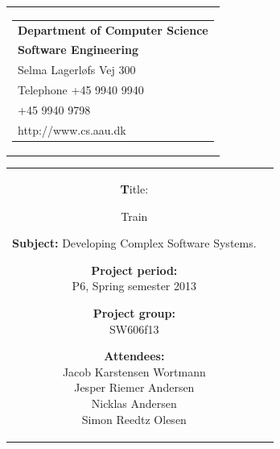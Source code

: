 \begin{titlingpage}
\begin{nopagebreak}
{\samepage 
\begin{tabular}{r}
\parbox{\textwidth}{  
\hfill \parbox{4.9cm}{\begin{tabular}{l}
{\textsf{\small \textbf{Department of Computer Science}}}\\
{\textsf{\small  \textbf{Software Engineering}}} \\
{\textsf{\small Selma Lagerløfs Vej 300}} \\
{\textsf{\small Telephone +45 9940 9940}} \\
{\textsf{\small +45 9940 9798}} \\
{\textsf{\small http://www.cs.aau.dk}}
\end{tabular}}}
\\
\end{tabular}

\begin{tabular}{cc}
\parbox{6cm}{
\begin{description}

\item {\textbf Title:} 

Train
  
\item {\textbf{Subject:}} 
Developing Complex Software Systems.

\end{description}

\parbox{8cm}{

\begin{description}
\item {\textbf{Project period:}}\\
   P6, Spring semester 2013\\
  \hspace{4cm}
\item {\textbf{Project group:}}\\
  SW606f13\\
  \hspace{4cm}
\item {\textbf{Attendees:}}\\
Jacob Karstensen Wortmann \\
Jesper Riemer Andersen \\
Nicklas Andersen \\
Simon Reedtz Olesen \\


\end{description}}}
\end{tabular}}
\end{nopagebreak}
\end{titlingpage}
